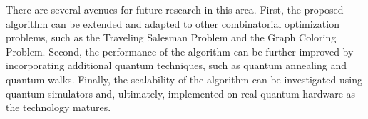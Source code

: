 There are several avenues for future research in this area. First, the proposed algorithm can be extended and adapted to other combinatorial optimization problems, such as the Traveling Salesman Problem and the Graph Coloring Problem. Second, the performance of the algorithm can be further improved by incorporating additional quantum techniques, such as quantum annealing and quantum walks. Finally, the scalability of the algorithm can be investigated using quantum simulators and, ultimately, implemented on real quantum hardware as the technology matures.

